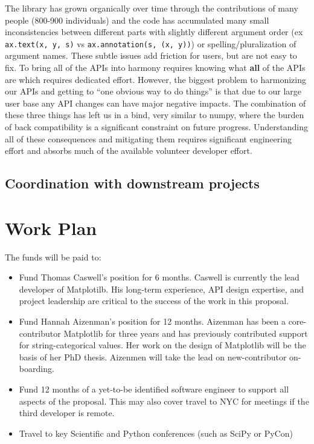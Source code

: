 \documentclass[11pt]{article}  %
\begin{document}
The library has grown organically over time through the contributions
of many people (800-900 individuals) and the code has accumulated many
small inconsistencies between different parts with slightly different
argument order (ex \texttt{ax.text(x, y, s)} vs
\texttt{ax.annotation(s, (x, y))}) or spelling/pluralization of
argument names. These subtle issues add friction for users, but are
not easy to fix.  To bring all of the APIs into harmony requires
knowing what \textbf{all} of the APIs are which requires dedicated
effort.  However, the biggest problem to harmonizing our APIs and
getting to “one obvious way to do things” is that due to our large
user base any API changes can have major negative impacts.  The
combination of these three things has left us in a bind, very similar
to numpy, where the burden of back compatibility is a significant
constraint on future progress.  Understanding all of these consequences
and mitigating them requires significant engineering effort and
absorbs much of the available volunteer developer effort.



\subsection{Coordination with downstream projects}

\section{Work Plan}
The funds will be paid to:

\begin{itemize}

\item Fund Thomas Caswell's position for 6 months.  Caswell is
  currently the lead developer of Matplotilb.  His long-term
  experience, API design expertise, and project leadership are critical
  to the success of the work in this proposal.
\item Fund Hannah Aizenman's position for 12 months.  Aizenman has
  been a core-contributor Matplotlib for three years and has
  previously contributed support for string-categorical values.  Her
  work on the design of Matplotlib will be the basis of her PhD
  thesis.  Aizenmen will take the lead on new-contributor on-boarding.
\item Fund 12 months of a yet-to-be identified software engineer to
  support all aspects of the proposal.  This may also cover travel to
  NYC for meetings if the third developer is remote.
\item Travel to key Scientific and Python conferences (such as SciPy
  or PyCon)
\end{itemize}
\end{document}
